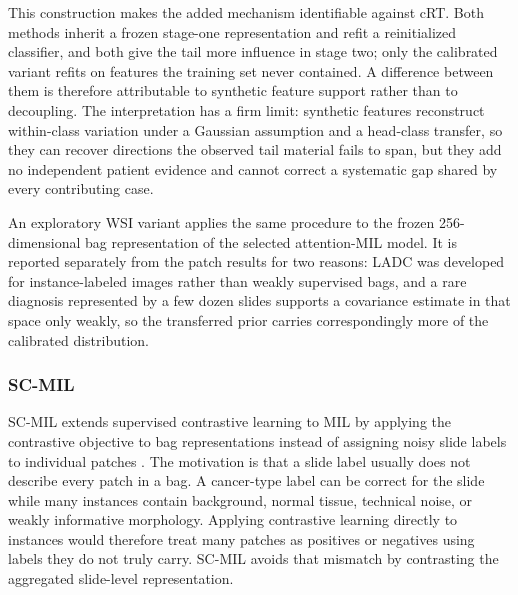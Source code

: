\documentclass[11pt]{article}
\begin{document}
This construction makes the added mechanism identifiable against cRT. Both methods inherit a frozen stage-one representation and refit a reinitialized classifier, and both give the tail more influence in stage two; only the calibrated variant refits on features the training set never contained. A difference between them is therefore attributable to synthetic feature support rather than to decoupling. The interpretation has a firm limit: synthetic features reconstruct within-class variation under a Gaussian assumption and a head-class transfer, so they can recover directions the observed tail material fails to span, but they add no independent patient evidence and cannot correct a systematic gap shared by every contributing case.

An exploratory WSI variant applies the same procedure to the frozen \num{256}-dimensional bag representation of the selected attention-MIL model. It is reported separately from the patch results for two reasons: LADC was developed for instance-labeled images rather than weakly supervised bags, and a rare diagnosis represented by a few dozen slides supports a covariance estimate in that space only weakly, so the transferred prior carries correspondingly more of the calibrated distribution.

\subsubsection{SC-MIL}
SC-MIL extends supervised contrastive learning to MIL by applying the contrastive objective to bag representations instead of assigning noisy slide labels to individual patches \citep{juyal2024scMil}. The motivation is that a slide label usually does not describe every patch in a bag. A cancer-type label can be correct for the slide while many instances contain background, normal tissue, technical noise, or weakly informative morphology. Applying contrastive learning directly to instances would therefore treat many patches as positives or negatives using labels they do not truly carry. SC-MIL avoids that mismatch by contrasting the aggregated slide-level representation.
\end{document}
